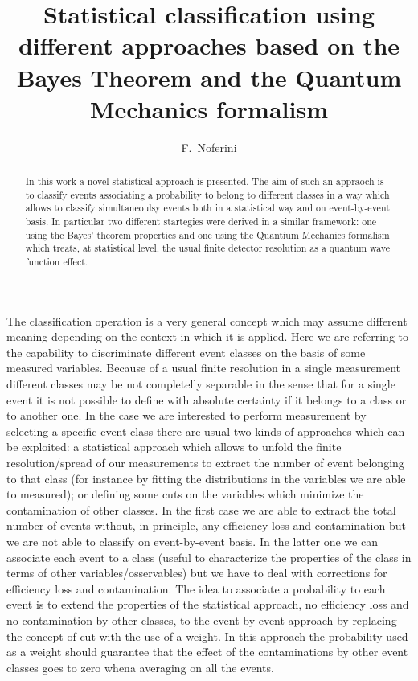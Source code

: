 \documentclass{cimento}
\title{Statistical classification using different approaches based on the Bayes Theorem and the Quantum Mechanics formalism}
\author{F.~Noferini\from{ins:centrofermi}\from{ins:infn}}
\begin{document}
\maketitle                            
\begin{abstract}
In this work a novel statistical approach is presented.
The aim of such an appraoch is to classify events associating a probability to belong to different classes in a way
which allows to classify simultaneoulsy events both in a statistical way and on event-by-event basis.
In particular two different startegies were derived in a similar framework: one using the Bayes' theorem properties
and one using the Quantium Mechanics formalism which treats, at statistical level, the usual finite detector resolution as a quantum
wave function effect.
\end{abstract}



The classification operation is a very general concept which may assume different meaning depending on the context in which
it is applied.
Here we are referring to the capability to discriminate different event classes on the basis of some
measured variables.
Because of a usual finite resolution in a single measurement different classes may be not completelly separable
in the sense that for a single event it is not possible to define with absolute certainty if it belongs to a class
or to another one.
In the case we are interested to perform measurement by selecting a specific event class there are usual two kinds of
approaches which can be exploited: a statistical approach which allows to unfold the finite resolution/spread of our
measurements to extract the number of event belonging to that class (for instance by fitting the distributions in the
variables we are able to measured); or defining some cuts on the variables which minimize the contamination of other classes.
In the first case we are able to extract the total number of events without, in principle, any efficiency loss and
contamination but we are not able to classify on event-by-event basis.
In the latter one we can associate each event to a class (useful to characterize the properties of the class in terms of
other variables/osservables) but we have to deal with corrections for efficiency loss and contamination.
The idea to associate a probability to each event is to extend the properties of the statistical approach, no
efficiency loss and no contamination by other classes, to the event-by-event approach by replacing the concept
of cut with the use of a  weight.
In this approach the probability used as a weight should guarantee that the effect of the contaminations by other
event classes goes to zero whena averaging on all the events.
\end{document}
